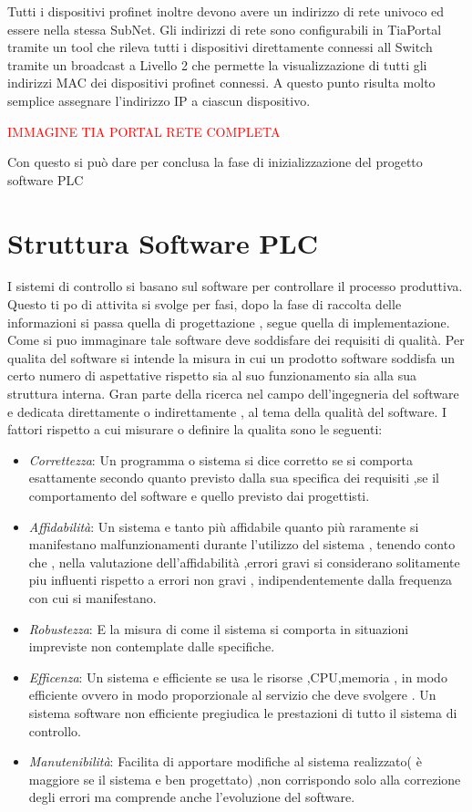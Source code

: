 \documentclass[12pt, a4paper, oneside]{book}
\begin{document}
	
	Tutti i dispositivi profinet inoltre devono avere un indirizzo di rete univoco ed essere nella stessa SubNet. Gli indirizzi di rete sono configurabili in TiaPortal tramite un tool che rileva tutti i dispositivi direttamente connessi all Switch tramite un broadcast a Livello 2 che permette la visualizzazione di tutti gli indirizzi MAC dei dispositivi profinet connessi. A questo punto risulta molto semplice assegnare l'indirizzo IP a ciascun dispositivo.
	
	\textcolor{red}{IMMAGINE TIA PORTAL RETE COMPLETA}
	
	Con questo si può dare per conclusa la fase di inizializzazione del progetto software PLC

\section{Struttura Software PLC}

I sistemi di controllo si basano sul software per controllare il processo produttiva. Questo ti po di attivita si svolge per fasi, dopo la fase di raccolta delle informazioni si passa quella di progettazione , segue quella di implementazione. Come si puo immaginare tale software deve soddisfare dei requisiti di qualità. Per qualita del software si intende la misura in cui un prodotto software soddisfa un certo numero di aspettative rispetto sia al suo funzionamento sia alla sua struttura interna. Gran parte della ricerca nel campo dell’ingegneria del software e dedicata direttamente o indirettamente , al tema della qualità del software. I fattori rispetto a cui misurare o definire la qualita sono le seguenti: 
\begin{itemize}
	\item \textit{Correttezza}: Un programma o sistema si dice corretto se si comporta esattamente secondo quanto previsto dalla sua specifica dei requisiti ,se il comportamento del software e quello previsto dai progettisti.  
	\item \textit{Affidabilità}: Un sistema e tanto più affidabile quanto più raramente si manifestano malfunzionamenti durante l’utilizzo del sistema , tenendo conto che , nella valutazione dell’affidabilità ,errori gravi si considerano solitamente piu influenti rispetto a errori non gravi , indipendentemente dalla frequenza con cui si manifestano.
	\item \textit{Robustezza}: E la misura di come il sistema si comporta in situazioni impreviste non contemplate dalle specifiche. 
	\item \textit{Efficenza}: Un sistema e efficiente se usa le risorse ,CPU,memoria , in modo efficiente ovvero in modo proporzionale al servizio che deve svolgere . Un sistema software non efficiente pregiudica le prestazioni di tutto il sistema di controllo.
	\item \textit{Manutenibilità}: Facilita di apportare modifiche al sistema realizzato( è maggiore se il sistema e ben progettato) ,non corrispondo solo alla correzione degli errori ma comprende anche l’evoluzione del software.
\end{itemize}
\end{document}
